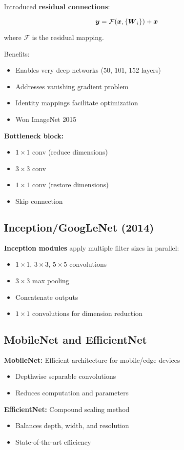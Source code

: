 Introduced \textbf{residual connections}:

\begin{equation}
\boldsymbol{y} = \mathcal{F}(\boldsymbol{x}, \{\boldsymbol{W}_i\}) + \boldsymbol{x}
\end{equation}

where $\mathcal{F}$ is the residual mapping.

Benefits:
\begin{itemize}
    \item Enables very deep networks (50, 101, 152 layers)
    \item Addresses vanishing gradient problem
    \item Identity mappings facilitate optimization
    \item Won ImageNet 2015
\end{itemize}

\textbf{Bottleneck block:}
\begin{itemize}
    \item $1 \times 1$ conv (reduce dimensions)
    \item $3 \times 3$ conv
    \item $1 \times 1$ conv (restore dimensions)
    \item Skip connection
\end{itemize}

\subsection{Inception/GoogLeNet (2014)}

\textbf{Inception modules} apply multiple filter sizes in parallel:
\begin{itemize}
    \item $1 \times 1$, $3 \times 3$, $5 \times 5$ convolutions
    \item $3 \times 3$ max pooling
    \item Concatenate outputs
    \item $1 \times 1$ convolutions for dimension reduction
\end{itemize}

\subsection{MobileNet and EfficientNet}

\textbf{MobileNet:} Efficient architecture for mobile/edge devices
\begin{itemize}
    \item Depthwise separable convolutions
    \item Reduces computation and parameters
\end{itemize}

\textbf{EfficientNet:} Compound scaling method
\begin{itemize}
    \item Balances depth, width, and resolution
    \item State-of-the-art efficiency
\end{itemize}

